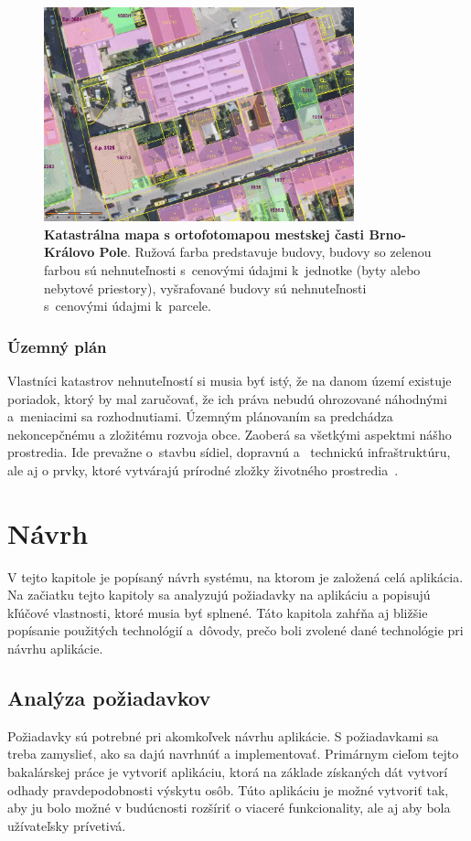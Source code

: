 \begin{figure}[ht]
    \centering
    \includegraphics[width=0.8\textwidth]{obrazky-figures/katastr-ortofo-kralovopole.jpg}
    \caption{\textbf{Katastrálna mapa s ortofotomapou mestskej časti Brno-Královo Pole}. Ružová farba predstavuje budovy, budovy so zelenou farbou sú nehnuteľnosti s~cenovými údajmi k~jednotke (byty alebo nebytové priestory), vyšrafované budovy sú nehnuteľnosti s~cenovými údajmi k~parcele.}
    \label{fig:katastrmapa}
\end{figure}

\subsection*{Územný plán}
Vlastníci katastrov nehnuteľností si musia byť istý, že na danom území existuje poriadok, ktorý by mal zaručovať, že ich práva nebudú ohrozované náhodnými a~meniacimi sa rozhodnutiami. Územným plánovaním sa predchádza nekoncepčnému a zložitému rozvoja obce. Zaoberá sa všetkými aspektmi nášho prostredia. Ide prevažne o~stavbu sídiel, dopravnú a~ technickú infraštruktúru, ale aj o prvky, ktoré vytvárajú prírodné zložky životného prostredia~\cite{uzemnyplan}.



\chapter{Návrh}
\label{chap:navrh}
V tejto kapitole je popísaný návrh systému, na ktorom je založená celá aplikácia. Na začiatku tejto kapitoly sa analyzujú požiadavky na aplikáciu a popisujú kľúčové vlastnosti, ktoré musia byť splnené. Táto kapitola zahŕňa aj bližšie popísanie použitých technológií a~dôvody, prečo boli zvolené dané technológie pri návrhu aplikácie.


\section{Analýza požiadavkov}
\label{sec:analysis}
Požiadavky sú potrebné pri akomkoľvek návrhu aplikácie. S požiadavkami sa treba zamyslieť, ako sa dajú navrhnúť a implementovať. Primárnym cieľom tejto bakalárskej práce je vytvoriť aplikáciu, ktorá na základe získaných dát vytvorí odhady pravdepodobnosti výskytu osôb. Túto aplikáciu je možné vytvoriť tak, aby ju bolo možné v budúcnosti rozšíriť o viaceré funkcionality, ale aj aby bola užívateľsky prívetivá.

